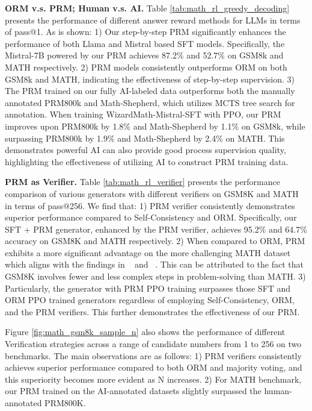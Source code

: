 \textbf{ORM v.s. PRM; Human v.s. AI.} Table \ref{tab:math_rl_greedy_decoding} presents the performance of different answer reward methods for LLMs in terms of pass@1. As is shown: 1) Our step-by-step PRM significantly enhances the performance of both Llama and Mistral based SFT models.  Specifically, the Mistral-7B powered by our PRM achieves 87.2\% and 52.7\% on GSM8k and MATH respectively. 2)  PRM models consistently outperforms ORM on both GSM8k and MATH, indicating the effectiveness of step-by-step supervision. 3) The PRM trained on our fully AI-labeled data  outperforms both the manually annotated PRM800k and Math-Shepherd, which utilizes MCTS tree search for annotation. When training WizardMath-Mistral-SFT with PPO, our PRM  improves upon PRM800k by 1.8\% and Math-Shepherd by 1.1\% on GSM8k, while surpassing PRM800k by 1.9\% and Math-Shepherd by 2.4\% on MATH. This demonstrates powerful AI can also provide good  process supervision quality, highlighting the effectiveness of utilizing AI to construct PRM training data. 

\textbf{PRM as Verifier.} Table \ref{tab:math_rl_verifier} presents the performance comparison of various generators with different verifiers on GSM8K and MATH in terms of pass@256. We find that: 1) PRM verifier consistently demonstrates superior performance compared to Self-Consistency and ORM. Specifically, our SFT + PRM generator, enhanced by the PRM verifier, achieves 95.2\% and 64.7\% accuracy on GSM8K and MATH respectively. 2) When compared to ORM, PRM exhibits a more significant advantage on the more challenging MATH dataset which aligns with the findings in ~\citep{uesato2022deepmind-orms} and ~\citep{lightman2023openai-verify-step-by-step}. This can be attributed to the fact that GSM8K involves fewer and less complex steps in problem-solving than MATH. 3) Particularly, the generator with PRM PPO training  surpasses those SFT and ORM PPO trained generators regardless of employing Self-Consistency, ORM, and the PRM verifiers. This further demonstrates the effectiveness of our PRM.

Figure \ref{fig:math_gsm8k_sample_n} also shows the performance of different Verification strategies across a range of candidate numbers from 1 to 256 on two benchmarks. The main observations are as follows: 1) PRM verifiers consistently achieves superior performance compared to both ORM and majority voting, and this superiority becomes more evident as N increases. 2) For MATH benchmark, our PRM trained on the AI-annotated datasets slightly surpassed the human-annotated PRM800K.

